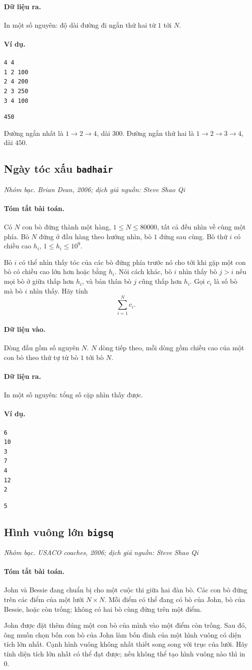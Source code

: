 \documentclass[11pt]{article}
\newcommand{\problem}[4]{%
  \subsection[#1 (#2)]{#1 \hfill {\normalsize\texttt{#2}}}%
  \noindent\textit{#3. #4}\par\smallskip
}
\newcommand{\iosec}[1]{\paragraph{#1}}
\begin{document}
\iosec{Dữ liệu ra.}
In một số nguyên: độ dài đường đi ngắn thứ hai từ \(1\) tới \(N\).

\iosec{Ví dụ.}
\begin{verbatim}
4 4
1 2 100
2 4 200
2 3 250
3 4 100
\end{verbatim}

\begin{verbatim}
450
\end{verbatim}

Đường ngắn nhất là \(1\to2\to4\), dài \(300\). Đường ngắn thứ hai là
\(1\to2\to3\to4\), dài \(450\).

\problem{Ngày tóc xấu}{badhair}{Nhóm bạc}{Brian Dean, 2006; dịch giả nguồn: Steve Shao Qi}

\iosec{Tóm tắt bài toán.}
Có \(N\) con bò đứng thành một hàng, \(1\le N\le 80000\), tất cả đều nhìn về
cùng một phía. Bò \(N\) đứng ở đầu hàng theo hướng nhìn, bò \(1\) đứng sau
cùng. Bò thứ \(i\) có chiều cao \(h_i\), \(1\le h_i\le 10^9\).

Bò \(i\) có thể nhìn thấy tóc của các bò đứng phía trước nó cho tới khi gặp
một con bò có chiều cao lớn hơn hoặc bằng \(h_i\). Nói cách khác, bò \(i\)
nhìn thấy bò \(j>i\) nếu mọi bò ở giữa thấp hơn \(h_i\), và bản thân bò
\(j\) cũng thấp hơn \(h_i\). Gọi \(c_i\) là số bò mà bò \(i\) nhìn thấy. Hãy
tính
\[
  \sum_{i=1}^{N} c_i.
\]

\iosec{Dữ liệu vào.}
Dòng đầu gồm số nguyên \(N\). \(N\) dòng tiếp theo, mỗi dòng gồm chiều cao của
một con bò theo thứ tự từ bò \(1\) tới bò \(N\).

\iosec{Dữ liệu ra.}
In một số nguyên: tổng số cặp nhìn thấy được.

\iosec{Ví dụ.}
\begin{verbatim}
6
10
3
7
4
12
2
\end{verbatim}

\begin{verbatim}
5
\end{verbatim}

\problem{Hình vuông lớn}{bigsq}{Nhóm bạc}{USACO coaches, 2006; dịch giả nguồn: Steve Shao Qi}

\iosec{Tóm tắt bài toán.}
John và Bessie đang chuẩn bị cho một cuộc thi giữa hai đàn bò. Các con bò
đứng trên các điểm của một lưới \(N\times N\). Mỗi điểm có thể đang có bò của
John, bò của Bessie, hoặc còn trống; không có hai bò cùng đứng trên một điểm.

John được đặt thêm đúng một con bò của mình vào một điểm còn trống. Sau đó,
ông muốn chọn bốn con bò của John làm bốn đỉnh của một hình vuông có diện
tích lớn nhất. Cạnh hình vuông không nhất thiết song song với trục của lưới.
Hãy tính diện tích lớn nhất có thể đạt được; nếu không thể tạo hình vuông nào
thì in \(0\).
\end{document}
